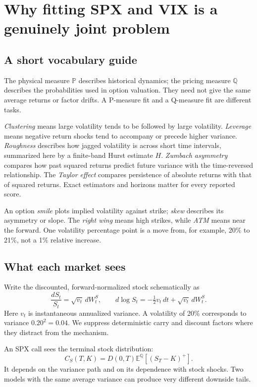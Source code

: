 \documentclass[11pt,a4paper]{article}
\newcommand{\E}{\mathbb E^{\mathbb Q}}
\begin{document}
\section{Why fitting SPX and VIX is a genuinely joint problem}
\subsection{A short vocabulary guide}
The physical measure $\mathbb P$ describes historical dynamics; the pricing measure $\mathbb Q$ describes the probabilities used in option valuation. They need not give the same average returns or factor drifts. A P-measure fit and a Q-measure fit are different tasks.

\emph{Clustering} means large volatility tends to be followed by large volatility. \emph{Leverage} means negative return shocks tend to accompany or precede higher variance. \emph{Roughness} describes how jagged volatility is across short time intervals, summarized here by a finite-band Hurst estimate $H$. \emph{Zumbach asymmetry} compares how past squared returns predict future variance with the time-reversed relationship. The \emph{Taylor effect} compares persistence of absolute returns with that of squared returns. Exact estimators and horizons matter for every reported score.

An option \emph{smile} plots implied volatility against strike; \emph{skew} describes its asymmetry or slope. The \emph{right wing} means high strikes, while \emph{ATM} means near the forward. One volatility percentage point is a move from, for example, 20\% to 21\%, not a 1\% relative increase.

\subsection{What each market sees}
Write the discounted, forward-normalized stock schematically as
\begin{equation}
\frac{dS_t}{S_t}=\sqrt{v_t}\,dW_t^S,
\qquad d\log S_t=-\tfrac12v_t\,dt+\sqrt{v_t}\,dW_t^S.
\end{equation}
Here $v_t$ is instantaneous annualized variance. A volatility of 20\% corresponds to variance $0.20^2=0.04$. We suppress deterministic carry and discount factors where they distract from the mechanism.

An SPX call sees the terminal stock distribution:
\begin{equation}
C_S(T,K)=D(0,T)\E[(S_T-K)^+].
\end{equation}
It depends on the variance path and on its dependence with stock shocks. Two models with the same average variance can produce very different downside tails.
\end{document}
